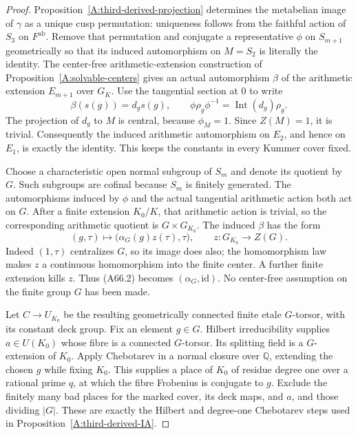 \begin{proof}
Proposition~\ref{A:third-derived-projection} determines
the metabelian image of $\gamma$ as a unique cusp
permutation: uniqueness follows from the faithful
action of $S_3$ on $F^{\mathrm{ab}}$.
Remove that permutation and conjugate a representative
$\phi$ on $S_{m+1}$ geometrically so that its induced
automorphism on $M=S_2$ is literally the identity.
The center-free arithmetic-extension construction of
Proposition~\ref{A:solvable-centers} gives an actual
automorphism $\beta$ of the arithmetic extension
$E_{m+1}$ over $G_K$. Use the tangential section at
$0$ to write
\[
 \beta(s(g))=d_gs(g),\qquad
 \phi\rho_g\phi^{-1}=\operatorname{Int}(d_g)\rho_g.
\]
The projection of $d_g$ to $M$ is central, because
$\phi_M=1$. Since $Z(M)=1$, it is trivial.
Consequently the induced arithmetic automorphism
on $E_2$, and hence on $E_1$, is exactly the
identity. This keeps the constants in every Kummer
cover fixed.

Choose a characteristic open normal subgroup of
$S_m$ and denote its quotient by $G$.
Such subgroups are cofinal because $S_m$ is finitely
generated. The automorphisms induced by $\phi$ and
the actual tangential arithmetic action both act
on $G$. After a finite extension $K_0/K$, that
arithmetic action is trivial, so the corresponding
arithmetic quotient is
$G\times G_{K_0}$. The induced $\beta$ has the form
\[
 (g,\tau)\longmapsto
             \bigl(\alpha_G(g)z(\tau),\tau\bigr),
       \qquad z:G_{K_0}\longrightarrow Z(G).
                                                        \tag{A66.2}
\]
Indeed $(1,\tau)$ centralizes $G$, so its image
does also; the homomorphism law makes $z$ a
continuous homomorphism into the finite center.
A further finite extension kills $z$.
Thus (A66.2) becomes $(\alpha_G,\mathrm{id})$.
No center-free assumption on the finite group
$G$ has been made.

Let $C\to U_{K_0}$ be the resulting geometrically
connected finite etale $G$-torsor, with its constant
deck group. Fix an element $g\in G$.
Hilbert irreducibility supplies $a\in U(K_0)$
whose fibre is a connected $G$-torsor.
Its splitting field is a $G$-extension of $K_0$.
Apply Chebotarev in a normal closure over
$\mathbb Q$, extending the chosen $g$ while
fixing $K_0$. This supplies a place of $K_0$
of residue degree one over a rational prime $q$,
at which the fibre Frobenius is conjugate to $g$.
Exclude the finitely many bad places for the
marked cover, its deck maps, and $a$, and those
dividing $|G|$. These are exactly the Hilbert and
degree-one Chebotarev steps used in
Proposition~\ref{A:third-derived-IA}.


\end{proof}
